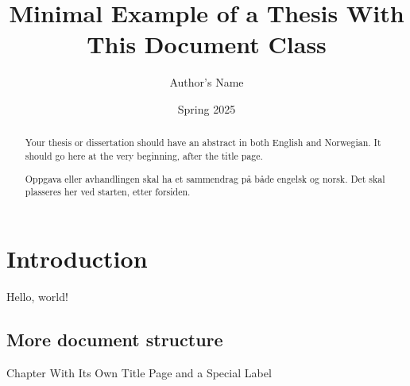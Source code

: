 \documentclass[master]{thesis}
\title{Minimal Example of a Thesis With This Document Class}
\author{Author's Name}
\date{Spring 2025}
\begin{document}
\maketitle

\frontmatter

\begin{abstract}

Your thesis or dissertation should have an abstract in both English and Norwegian. It should go here at the very beginning, after the title page.

\end{abstract}

\begin{otherlanguage}{norsk}
\begin{abstract}

Oppgava eller avhandlingen skal ha et sammendrag på både engelsk og norsk. Det skal plasseres her ved starten, etter forsiden.

\end{abstract}
\end{otherlanguage}

\tableofcontents

\mainmatter

\chapter{Introduction}

Hello, world! \lipsum[1]

\section{More document structure}

\lipsum[2-9]

\begin{dividerpage}[uitbluelight]
    {Chapter With Its Own Title Page and a Special Label} %
\end{dividerpage}

\lipsum[10-15]
\end{document}
